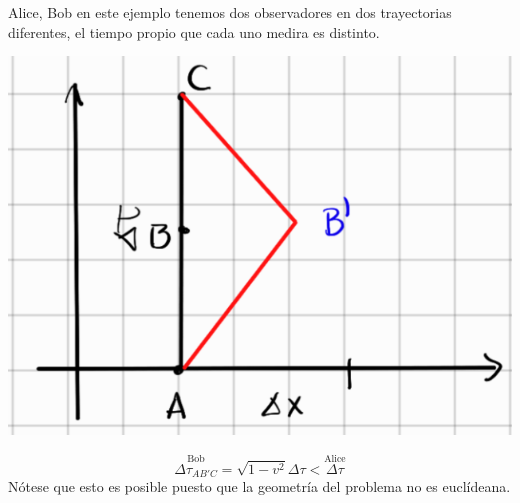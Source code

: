 \documentclass[../main]{subfiles}
\begin{document}
 Alice, Bob en este ejemplo tenemos dos observadores en dos trayectorias diferentes, el tiempo propio que cada uno medira es distinto. 
\begin{center}
    \includegraphics[scale=0.5]{img/imgRG2.5.PNG}
\end{center}
\begin{equation}
    \stackrel{\text{Bob}}{\Delta \tau_{AB'C}}=\sqrt{1-v^2}\Delta \tau < \stackrel{\text{Alice}}{\Delta \tau}
\end{equation}
Nótese que esto es posible puesto que la geometría del problema no es euclídeana.
\end{document}
